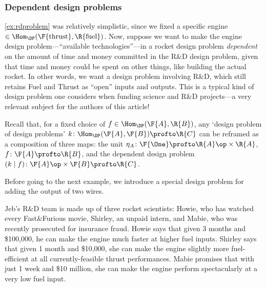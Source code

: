 \subsubsection{Dependent design problems}
\cref{ex:rdproblem} was relatively simplistic, since we fixed a specific engine $\in \Hom_\DP(\F{\text{thrust}}, \R{\text{fuel}})$. Now, suppose we want to make the engine design problem---``available technologies''---in a rocket design problem \emph{dependent} on the amount of time and money committed in the R\&D design problem, given that time and money could be spent on other things, like building the actual rocket. In other words, we want a design problem involving R\&D, which still retains Fuel and Thrust as ``open'' inputs and outputs. This is a typical kind of design problem one considers when funding science and R\&D projects---a very relevant subject for the authors of this article!

Recall that, for a fixed choice of $f \in \Hom_\DP(\F{A},\R{B})$, any `design problem of design problems' $k \colon \Hom_\DP(\F{A},\F{B}) \profto \R{C}$ can be reframed as a composition of three maps: the unit $\eta_A \colon \F{\One} \profto \R{A}\op \times \R{A}$, $f \colon \F{A} \profto \R{B}$, and the dependent design problem $(k \mid f) \colon \F{A}\op \times \F{B} \profto \R{C}$.


Before going to the next example, we introduce a special design problem for adding the output of two wires.


\begin{example}
    Jeb's R\&D team is made up of three rocket scientists: Howie, who has watched every Fast\&Furious movie, Shirley, an unpaid intern, and Mabie, who was recently prosecuted for insurance fraud. Howie says that given 3 months and \$100,000, he can make the engine much faster at higher fuel inputs. Shirley says that given 1 month and \$10,000, she can make the engine slightly more fuel-efficient at all currently-feasible thrust performances. Mabie promises that with just 1 week and \$10 million, she can make the engine perform spectacularly at a very low fuel input.
\end{example}

